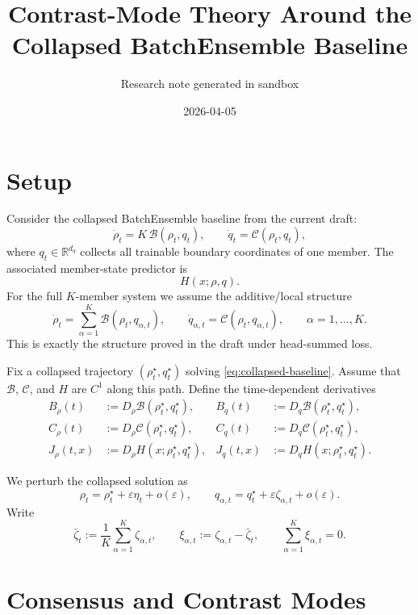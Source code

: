 \documentclass[11pt]{article}
\title{Contrast-Mode Theory Around the Collapsed BatchEnsemble Baseline}
\author{Research note generated in sandbox}
\date{2026-04-05}
\newcommand{\R}{\mathbb{R}}
\theoremstyle{remark}
\begin{document}
\maketitle

\section{Setup}

Consider the collapsed BatchEnsemble baseline from the current draft:
\begin{equation}
\dot\rho_t = K\,\mathcal B(\rho_t,q_t),
\qquad
\dot q_t = \mathcal C(\rho_t,q_t),
\label{eq:collapsed-baseline}
\end{equation}
where $q_t \in \R^{d_q}$ collects all trainable boundary coordinates of one member. The associated member-state predictor is
\[
H(x;\rho,q).
\]
For the full $K$-member system we assume the additive/local structure
\begin{equation}
\dot\rho_t = \sum_{\alpha=1}^K \mathcal B(\rho_t,q_{\alpha,t}),
\qquad
\dot q_{\alpha,t} = \mathcal C(\rho_t,q_{\alpha,t}),
\qquad
\alpha=1,\dots,K.
\label{eq:full-system}
\end{equation}
This is exactly the structure proved in the draft under head-summed loss.

Fix a collapsed trajectory $(\rho_t^\star,q_t^\star)$ solving \eqref{eq:collapsed-baseline}. Assume that $\mathcal B$, $\mathcal C$, and $H$ are $C^1$ along this path. Define the time-dependent derivatives
\begin{align*}
B_\rho(t) &:= D_\rho \mathcal B(\rho_t^\star,q_t^\star),
&
B_q(t) &:= D_q \mathcal B(\rho_t^\star,q_t^\star),\\
C_\rho(t) &:= D_\rho \mathcal C(\rho_t^\star,q_t^\star),
&
C_q(t) &:= D_q \mathcal C(\rho_t^\star,q_t^\star),\\
J_\rho(t,x) &:= D_\rho H(x;\rho_t^\star,q_t^\star),
&
J_q(t,x) &:= D_q H(x;\rho_t^\star,q_t^\star).
\end{align*}

We perturb the collapsed solution as
\[
\rho_t = \rho_t^\star + \varepsilon \eta_t + o(\varepsilon),
\qquad
q_{\alpha,t} = q_t^\star + \varepsilon \zeta_{\alpha,t} + o(\varepsilon).
\]
Write
\[
\bar\zeta_t := \frac1K \sum_{\alpha=1}^K \zeta_{\alpha,t},
\qquad
\xi_{\alpha,t} := \zeta_{\alpha,t} - \bar\zeta_t,
\qquad
\sum_{\alpha=1}^K \xi_{\alpha,t} = 0.
\]

\section{Consensus and Contrast Modes}
\end{document}
